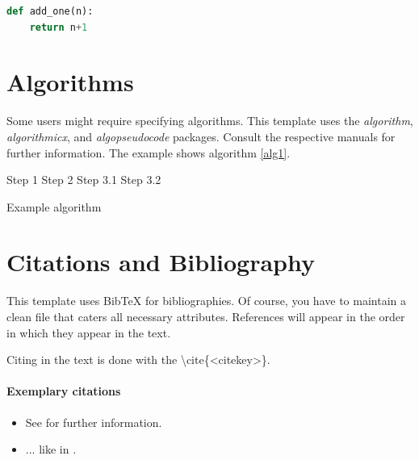 \begin{lstlisting}[float=htp, caption={Simple function implemented in Python}, label={lst:euclid}, language=Python, deletekeywords={}, morekeywords={}]
def add_one(n):
    return n+1
\end{lstlisting}

\section{Algorithms}
Some users might require specifying algorithms. This template uses the \textit{algorithm}, \textit{algorithmicx}, and \textit{algopseudocode} packages. Consult the respective manuals for further information. 
The example shows algorithm \ref{alg1}.

\begin{algorithm}[htb]
\footnotesize
\begin{algorithmic}[1]
    \State Step 1
    \State Step 2 
  	    \State Step 3.1
    \Else 
  	    \State Step 3.2
    \EndIf
\end{algorithmic}
\caption{\label{alg1} Example algorithm}
\end{algorithm}

\section{Citations and Bibliography}
This template uses {BibTeX} for bibliographies. Of course, you have to maintain a clean  file that caters all necessary attributes. References will appear in the order in which they appear in the text.

Citing in the text is done with the \textbackslash cite\{<citekey>\}.

\paragraph{Exemplary citations}

\begin{itemize}
	\item See \cite{Kist2021featurebased} for further information.
	\item ... like in \cite{Kist2021openhsv}.
\end{itemize}

